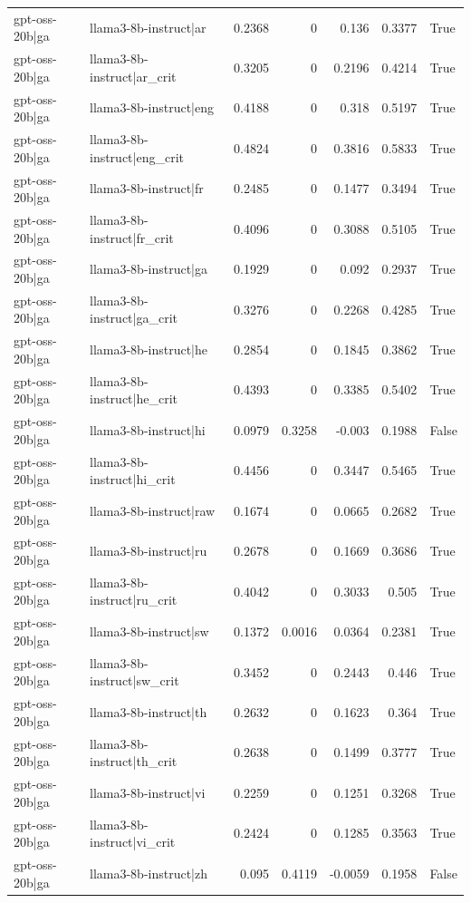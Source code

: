 \begin{table}
\begin{tabular}{l l r r r r l}
gpt-oss-20b|ga & llama3-8b-instruct|ar & 0.2368 & 0 & 0.136 & 0.3377 & True \\
gpt-oss-20b|ga & llama3-8b-instruct|ar_crit & 0.3205 & 0 & 0.2196 & 0.4214 & True \\
gpt-oss-20b|ga & llama3-8b-instruct|eng & 0.4188 & 0 & 0.318 & 0.5197 & True \\
gpt-oss-20b|ga & llama3-8b-instruct|eng_crit & 0.4824 & 0 & 0.3816 & 0.5833 & True \\
gpt-oss-20b|ga & llama3-8b-instruct|fr & 0.2485 & 0 & 0.1477 & 0.3494 & True \\
gpt-oss-20b|ga & llama3-8b-instruct|fr_crit & 0.4096 & 0 & 0.3088 & 0.5105 & True \\
gpt-oss-20b|ga & llama3-8b-instruct|ga & 0.1929 & 0 & 0.092 & 0.2937 & True \\
gpt-oss-20b|ga & llama3-8b-instruct|ga_crit & 0.3276 & 0 & 0.2268 & 0.4285 & True \\
gpt-oss-20b|ga & llama3-8b-instruct|he & 0.2854 & 0 & 0.1845 & 0.3862 & True \\
gpt-oss-20b|ga & llama3-8b-instruct|he_crit & 0.4393 & 0 & 0.3385 & 0.5402 & True \\
gpt-oss-20b|ga & llama3-8b-instruct|hi & 0.0979 & 0.3258 & -0.003 & 0.1988 & False \\
gpt-oss-20b|ga & llama3-8b-instruct|hi_crit & 0.4456 & 0 & 0.3447 & 0.5465 & True \\
gpt-oss-20b|ga & llama3-8b-instruct|raw & 0.1674 & 0 & 0.0665 & 0.2682 & True \\
gpt-oss-20b|ga & llama3-8b-instruct|ru & 0.2678 & 0 & 0.1669 & 0.3686 & True \\
gpt-oss-20b|ga & llama3-8b-instruct|ru_crit & 0.4042 & 0 & 0.3033 & 0.505 & True \\
gpt-oss-20b|ga & llama3-8b-instruct|sw & 0.1372 & 0.0016 & 0.0364 & 0.2381 & True \\
gpt-oss-20b|ga & llama3-8b-instruct|sw_crit & 0.3452 & 0 & 0.2443 & 0.446 & True \\
gpt-oss-20b|ga & llama3-8b-instruct|th & 0.2632 & 0 & 0.1623 & 0.364 & True \\
gpt-oss-20b|ga & llama3-8b-instruct|th_crit & 0.2638 & 0 & 0.1499 & 0.3777 & True \\
gpt-oss-20b|ga & llama3-8b-instruct|vi & 0.2259 & 0 & 0.1251 & 0.3268 & True \\
gpt-oss-20b|ga & llama3-8b-instruct|vi_crit & 0.2424 & 0 & 0.1285 & 0.3563 & True \\
gpt-oss-20b|ga & llama3-8b-instruct|zh & 0.095 & 0.4119 & -0.0059 & 0.1958 & False \\

\end{tabular}
\end{table}
